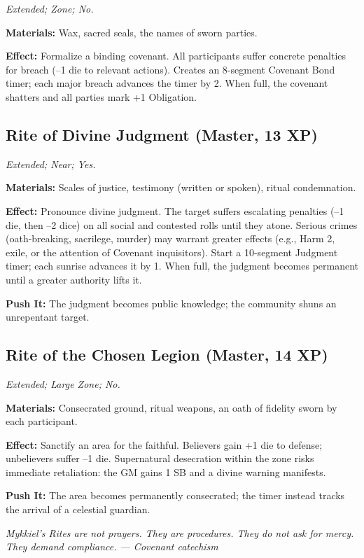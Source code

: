 \documentclass{book}
\newcommand{\citation}[1]{\textcolor{marginalia}{\small\textit{#1}}}
\begin{document}
\textit{Extended; Zone; No.}

\textbf{Materials:} Wax, sacred seals, the names of sworn parties.

\textbf{Effect:} Formalize a binding covenant. All participants suffer concrete penalties for breach (--1 die to relevant actions). Creates an 8-segment Covenant Bond timer; each major breach advances the timer by 2. When full, the covenant shatters and all parties mark +1 Obligation.

\subsection{Rite of Divine Judgment (Master, 13 XP)}

\textit{Extended; Near; Yes.}

\textbf{Materials:} Scales of justice, testimony (written or spoken), ritual condemnation.

\textbf{Effect:} Pronounce divine judgment. The target suffers escalating penalties (--1 die, then --2 dice) on all social and contested rolls until they atone. Serious crimes (oath-breaking, sacrilege, murder) may warrant greater effects (e.g., Harm 2, exile, or the attention of Covenant inquisitors). Start a 10-segment Judgment timer; each sunrise advances it by 1. When full, the judgment becomes permanent until a greater authority lifts it.

\textbf{Push It:} The judgment becomes public knowledge; the community shuns an unrepentant target.

\subsection{Rite of the Chosen Legion (Master, 14 XP)}

\textit{Extended; Large Zone; No.}

\textbf{Materials:} Consecrated ground, ritual weapons, an oath of fidelity sworn by each participant.

\textbf{Effect:} Sanctify an area for the faithful. Believers gain +1 die to defense; unbelievers suffer --1 die. Supernatural desecration within the zone risks immediate retaliation: the GM gains 1 SB and a divine warning manifests.

\textbf{Push It:} The area becomes permanently consecrated; the timer instead tracks the arrival of a celestial guardian.

\citation{Mykkiel's Rites are not prayers. They are procedures. They do not ask for mercy. They demand compliance. --- Covenant catechism}
\end{document}

